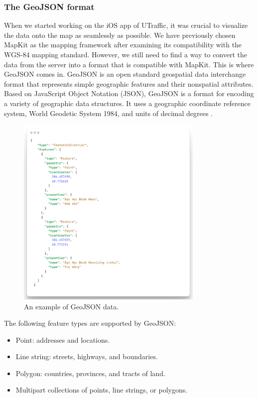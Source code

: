 \subsubsection{The GeoJSON format}
When we started working on the iOS app of UTraffic, it was crucial to visualize the data onto the map as seamlessly as possible. We have previously chosen MapKit as the mapping framework after examining its compatibility with the WGS-84 mapping standard. However, we still need to find a way to convert the data from the server into a format that is compatible with MapKit. This is where GeoJSON comes in.
GeoJSON is an open standard geospatial data interchange format that represents simple geographic features and their nonspatial attributes. Based on JavaScript Object Notation (JSON), GeoJSON is a format for encoding a variety of geographic data structures. It uses a geographic coordinate reference system, World Geodetic System 1984, and units of decimal degrees \cite{geojsonarcgis}. 

\begin{figure}[H]
    \centering
    \includegraphics[width=0.8\textwidth]{assets/images/Research/geojson/example_geojson.png}
    \caption{An example of GeoJSON data.}
    \label{fig:geojson_example}
\end{figure}

The following feature types are supported by GeoJSON:
\begin{itemize}
    \item Point: addresses and locations.
    \item Line string: streets, highways, and boundaries.
    \item Polygon: countries, provinces, and tracts of land.
    \item Multipart collections of points, line strings, or polygons.
\end{itemize}

